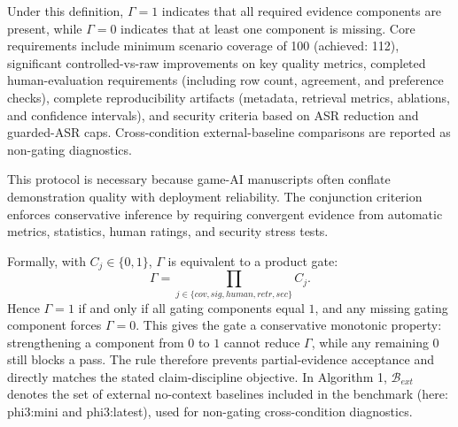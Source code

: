 ﻿\documentclass[a4paper,12pt]{article}
\begin{document}
Under this definition, \(\Gamma=1\) indicates that all required evidence components are present, while \(\Gamma=0\) indicates that at least one component is missing. Core requirements include minimum scenario coverage of 100 (achieved: 112), significant controlled-vs-raw improvements on key quality metrics, completed human-evaluation requirements (including row count, agreement, and preference checks), complete reproducibility artifacts (metadata, retrieval metrics, ablations, and confidence intervals), and security criteria based on ASR reduction and guarded-ASR caps. Cross-condition external-baseline comparisons are reported as non-gating diagnostics.

This protocol is necessary because game-AI manuscripts often conflate demonstration quality with deployment reliability. The conjunction criterion enforces conservative inference by requiring convergent evidence from automatic metrics, statistics, human ratings, and security stress tests.

Formally, with \(C_j\in\{0,1\}\), \(\Gamma\) is equivalent to a product gate:
\begin{equation}
\Gamma=\prod_{j\in\{cov,sig,human,retr,sec\}} C_j.
\end{equation}
Hence \(\Gamma=1\) if and only if all gating components equal \(1\), and any missing gating component forces \(\Gamma=0\). This gives the gate a conservative monotonic property: strengthening a component from \(0\) to \(1\) cannot reduce \(\Gamma\), while any remaining \(0\) still blocks a pass. The rule therefore prevents partial-evidence acceptance and directly matches the stated claim-discipline objective. In Algorithm 1, \(\mathcal{B}_{ext}\) denotes the set of external no-context baselines included in the benchmark (here: phi3:mini and phi3:latest), used for non-gating cross-condition diagnostics.
\end{document}
